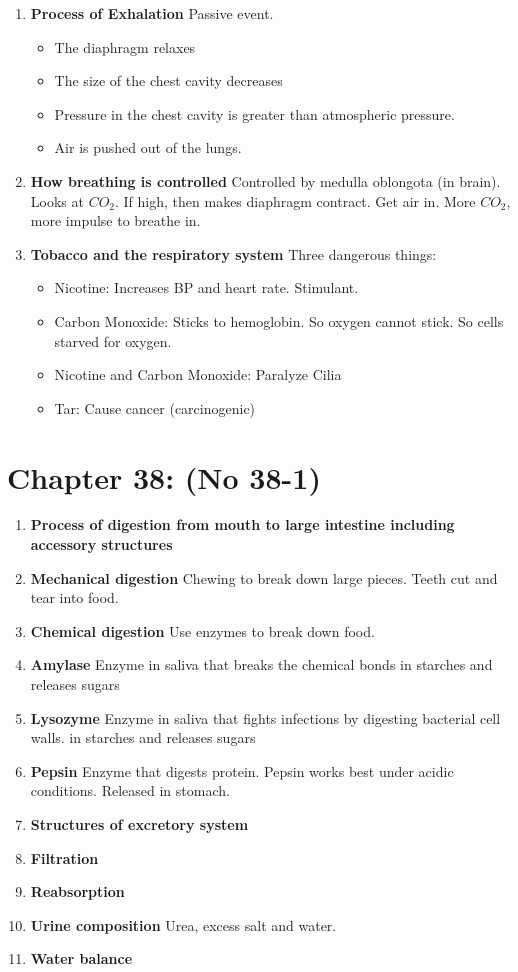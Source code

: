 \documentclass[9pt]{article}
\begin{document}
\begin{enumerate}
  \item {\bf Process of Exhalation} Passive event.
    \begin{itemize}
    \item The diaphragm relaxes
    \item The size of the chest cavity decreases
    \item Pressure in the chest cavity is greater than atmospheric
      pressure.
    \item Air is pushed out of the lungs.
    \end{itemize}
  \item {\bf How breathing is controlled} Controlled by medulla
    oblongota (in brain). Looks at $CO_2$. If high, then makes
    diaphragm contract. Get air in. More $CO_2$, more impulse to
    breathe in.
  \item {\bf Tobacco and the respiratory system} Three dangerous
    things:
    \begin{itemize}
    \item Nicotine: Increases BP and heart rate. Stimulant.
    \item Carbon Monoxide: Sticks to hemoglobin. So oxygen cannot stick. So cells starved for oxygen.
    \item Nicotine and Carbon Monoxide: Paralyze Cilia
    \item Tar: Cause cancer (carcinogenic)
    \end{itemize}
\end{enumerate}
\section*{Chapter 38: (No 38-1)}
\begin{enumerate}
  \item {\bf Process of digestion from mouth to large intestine including accessory structures}
  \item {\bf Mechanical digestion} Chewing to break down large
    pieces. Teeth cut and tear into food.
  \item {\bf Chemical digestion}  Use enzymes to break down food.
  \item {\bf Amylase} Enzyme in saliva that breaks the chemical bonds
    in starches and releases sugars
  \item {\bf Lysozyme} Enzyme in saliva that fights infections by
    digesting bacterial cell walls.  in starches and releases sugars
  \item {\bf Pepsin} Enzyme that digests protein. Pepsin works best
    under acidic conditions. Released in stomach.
  \item {\bf Structures of excretory system}
  \item {\bf Filtration}
  \item {\bf Reabsorption}
  \item {\bf Urine composition} Urea, excess salt and water.
  \item {\bf Water balance}
\end{enumerate}
\end{document}
